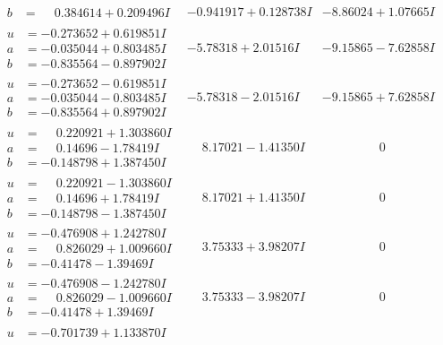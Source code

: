 \documentclass[1p]{elsarticle_modified}
\theoremstyle{definition}
\begin{document}
$$\begin{array}{c|c|c}
\begin{aligned}
b &= \phantom{-}0.384614 + 0.209496 I\end{aligned}
 & -0.941917 + 0.128738 I & -8.86024 + 1.07665 I \\ \hline\begin{aligned}
u &= -0.273652 + 0.619851 I \\
a &= -0.035044 + 0.803485 I \\
b &= -0.835564 - 0.897902 I\end{aligned}
 & -5.78318 + 2.01516 I & -9.15865 - 7.62858 I \\ \hline\begin{aligned}
u &= -0.273652 - 0.619851 I \\
a &= -0.035044 - 0.803485 I \\
b &= -0.835564 + 0.897902 I\end{aligned}
 & -5.78318 - 2.01516 I & -9.15865 + 7.62858 I \\ \hline\begin{aligned}
u &= \phantom{-}0.220921 + 1.303860 I \\
a &= \phantom{-}0.14696 - 1.78419 I \\
b &= -0.148798 + 1.387450 I\end{aligned}
 & \phantom{-}8.17021 - 1.41350 I & \phantom{-0.000000 } 0 \\ \hline\begin{aligned}
u &= \phantom{-}0.220921 - 1.303860 I \\
a &= \phantom{-}0.14696 + 1.78419 I \\
b &= -0.148798 - 1.387450 I\end{aligned}
 & \phantom{-}8.17021 + 1.41350 I & \phantom{-0.000000 } 0 \\ \hline\begin{aligned}
u &= -0.476908 + 1.242780 I \\
a &= \phantom{-}0.826029 + 1.009660 I \\
b &= -0.41478 - 1.39469 I\end{aligned}
 & \phantom{-}3.75333 + 3.98207 I & \phantom{-0.000000 } 0 \\ \hline\begin{aligned}
u &= -0.476908 - 1.242780 I \\
a &= \phantom{-}0.826029 - 1.009660 I \\
b &= -0.41478 + 1.39469 I\end{aligned}
 & \phantom{-}3.75333 - 3.98207 I & \phantom{-0.000000 } 0 \\ \hline\begin{aligned}
u &= -0.701739 + 1.133870 I \\

\end{aligned}
\end{array}$$
\end{document}
